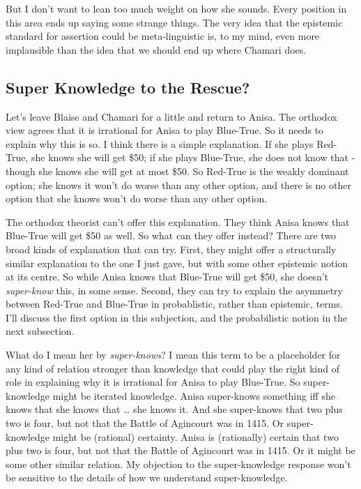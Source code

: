 \documentclass[
  11pt,
]{book}
\begin{document}
But I don't want to lean too much weight on how she sounds. Every position in this area ends up saying some strange things. The very idea that the epistemic standard for assertion could be meta-linguistic is, to my mind, even more implausible than the idea that we should end up where Chamari does.

\hypertarget{superknow}{%
\subsection{Super Knowledge to the Rescue?}\label{superknow}}

Let's leave Blaise and Chamari for a little and return to Anisa. The orthodox view agrees that it is irrational for Anisa to play Blue-True. So it needs to explain why this is so. I think there is a simple explanation. If she plays Red-True, she knows she will get \$50; if she plays Blue-True, she does not know that - though she knows she will get at most \$50. So Red-True is the weakly dominant option; she knows it won't do worse than any other option, and there is no other option that she knows won't do worse than any other option.

The orthodox theorist can't offer this explanation. They think Anisa knows that Blue-True will get \$50 as well. So what can they offer instead? There are two broad kinds of explanation that can try. First, they might offer a structurally similar explanation to the one I just gave, but with some other epistemic notion at its centre. So while Anisa knows that Blue-True will get \$50, she doesn't \emph{super-know} this, in some sense. Second, they can try to explain the asymmetry between Red-True and Blue-True in probablistic, rather than epistemic, terms. I'll discuss the first option in this subjection, and the probabilistic notion in the next subsection.

What do I mean her by \emph{super-knows}? I mean this term to be a placeholder for any kind of relation stronger than knowledge that could play the right kind of role in explaining why it is irrational for Anisa to play Blue-True. So super-knowledge might be iterated knowledge. Anisa super-knows something iff she knows that she knows that \ldots{} she knows it. And she super-knows that two plus two is four, but not that the Battle of Agincourt was in 1415. Or super-knowledge might be (rational) certainty. Anisa is (rationally) certain that two plus two is four, but not that the Battle of Agincourt was in 1415. Or it might be some other similar relation. My objection to the super-knowledge response won't be sensitive to the details of how we understand super-knowledge.
\end{document}
